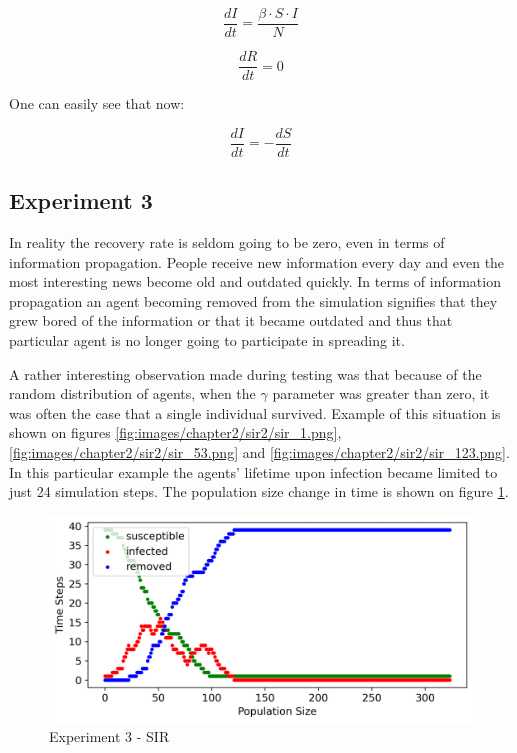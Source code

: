 \begin{equation} \label{eq:sir2_gamma0}
    \frac{{dI}}{{dt}} = \frac{{\beta \cdot S \cdot I}}{{N}}
\end{equation}

\begin{equation} \label{eq:sir3_gamma0}
    \frac{{dR}}{{dt}} = 0
\end{equation}

One can easily see that now:

\begin{equation}
    \frac{{dI}}{{dt}} = -\frac{{dS}}{{dt}}
\end{equation}

\subsection{Experiment 3}

In reality the recovery rate is seldom going to be zero, even in terms of information propagation.
People receive new information every day and even the most interesting news become old and outdated quickly.
In terms of information propagation an agent becoming removed from the simulation signifies that they grew bored of the information or that it became outdated and thus that particular agent is no longer going to participate in spreading it.


A rather interesting observation made during testing was that because of the random distribution of agents, when the $\gamma$ parameter was greater than zero, it was often the case that a single individual survived.
Example of this situation is shown on figures \ref{fig:images/chapter2/sir2/sir_1.png}, \ref{fig:images/chapter2/sir2/sir_53.png} and \ref{fig:images/chapter2/sir2/sir_123.png}.
In this particular example the agents' lifetime upon infection became limited to just 24 simulation steps.
The population size change in time is shown on figure \ref{fig:images/chapter2/sir2/sir.png}.

\begin{figure}[H]
    \centering
    \includegraphics[width=1.0\textwidth]{images/chapter2/sir2/sir.png}
    \caption{Experiment 3 - SIR}\label{fig:images/chapter2/sir2/sir.png}
\end{figure}

